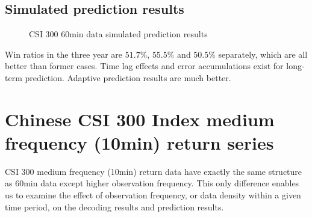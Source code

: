 \subsection{Simulated prediction results}
\label{sec:positive:CSI60:prediction}
        \begin{figure}[!hbt]
        \begin{center}
        \end{center}
        \caption{CSI 300 60min data simulated prediction results}
        \label{fig:CSI60:prediction}
        \end{figure}
Win ratios in the three year are $51.7\%$, $55.5\%$ and $50.5\%$ separately,
which are all better than former cases.
Time lag effects and error accumulations exist for long-term prediction.
Adaptive prediction results are much better.


\section{Chinese CSI 300 Index medium frequency (10min) return series}
\label{sec:positive:CSI10}
CSI 300 medium frequency (10min) return data have exactly the same structure as 60min data
except higher observation frequency.
This only difference enables us to examine the effect of observation frequency,
or data density within a given time period,
on the decoding results and prediction results.

